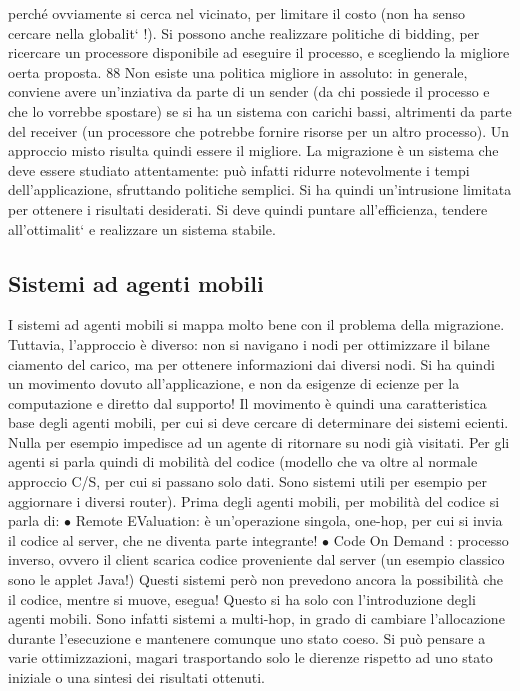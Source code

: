 perché ovviamente si cerca nel
vicinato, per limitare il costo (non ha senso cercare nella globalit` !). Si possono
anche realizzare politiche di bidding, per ricercare un processore disponibile ad
eseguire il processo, e scegliendo la migliore oerta proposta.
88
Non esiste una politica migliore in assoluto: in generale, conviene avere
un'inziativa da parte di un sender (da chi possiede il processo e che lo vorrebbe
spostare) se si ha un sistema con carichi bassi, altrimenti da parte del receiver
(un processore che potrebbe fornire risorse per un altro processo). Un approccio
misto risulta quindi essere il migliore.
La migrazione è un sistema che deve essere studiato attentamente: può
infatti ridurre notevolmente i tempi dell'applicazione, sfruttando politiche semplici. Si ha quindi un'intrusione
limitata per ottenere i risultati desiderati. Si
deve quindi puntare all'efficienza, tendere all'ottimalit` e realizzare un sistema
stabile.
\subsection{Sistemi ad agenti mobili}
I sistemi ad agenti mobili si mappa molto bene con il problema della migrazione.
Tuttavia, l'approccio è diverso: non si navigano i nodi per ottimizzare il bilane
ciamento del carico, ma per ottenere informazioni dai diversi nodi. Si ha quindi
un movimento dovuto all'applicazione, e non da esigenze di ecienze per la
computazione e diretto dal supporto!
Il movimento è quindi una caratteristica base degli agenti mobili, per cui si
deve cercare di determinare dei sistemi ecienti. Nulla per esempio impedisce
ad un agente di ritornare su nodi già visitati.
Per gli agenti si parla quindi di mobilità del codice (modello che va oltre
al normale approccio C/S, per cui si passano solo dati. Sono sistemi utili per
esempio per aggiornare i diversi router). Prima degli agenti mobili, per mobilità
del codice si parla di:
$\bullet$ Remote EValuation: è un'operazione singola, one-hop, per cui si invia il
codice al server, che ne diventa parte integrante!
$\bullet$ Code On Demand : processo inverso, ovvero il client scarica codice proveniente dal server (un esempio classico
sono le applet Java!)
Questi sistemi però non prevedono ancora la possibilità che il codice, mentre si
muove, esegua! Questo si ha solo con l'introduzione degli agenti mobili. Sono infatti sistemi a multi-hop, in grado di
cambiare l'allocazione durante l'esecuzione
e mantenere comunque uno stato coeso. Si può pensare a varie ottimizzazioni,
magari trasportando solo le dierenze rispetto ad uno stato iniziale o una sintesi
dei risultati ottenuti.
